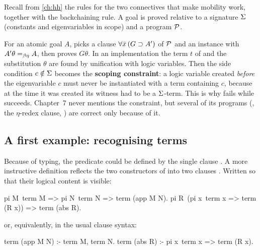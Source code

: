 {{Recall from \cref{ch:hh} the rules for the two connectives that make mobility work, together with the
backchaining rule. A goal is proved relative to a signature $\Sigma$ (constants and eigenvariables in scope)
and a program $\mathcal{P}$.
For an atomic goal $A$,  picks a clause $\forall\bar x\,(G\supset A')$ of $\mathcal{P}$ and an instance
with $A'\theta=_{\beta\eta} A$, then proves $G\theta$. In an implementation the term $t$ of  and the
substitution $\theta$ are found by unification with logic variables. Then the side condition $c\notin\Sigma$
becomes the \textbf{scoping constraint}: a logic variable created \emph{before} the eigenvariable $c$ must never
be instantiated with a term containing $c$, because at the time it was created its witness had to be a
$\Sigma$-term. This is why  fails while  succeeds. Chapter~7
never mentions the constraint, but several of its programs (, the $\eta$-redex clause,
) are correct only because of it.

\subsection{A first example: recognising terms}\label{sec:lambdatree-term}

Because of typing, the predicate  could be defined by the single clause . A more
instructive definition reflects the two constructors of  into two clauses . Written so that
their logical content is visible:
\begin{lprolog}
pi M\ term M => pi N\ term N => term (app M N).
pi R\ (pi x\ term x => term (R x)) => term (abs R).
\end{lprolog}
or, equivalently, in the usual clause syntax:
\begin{lprolog}
term (app M N) :- term M, term N.
term (abs R)   :- pi x\ term x => term (R x).
\end{lprolog}

}}
